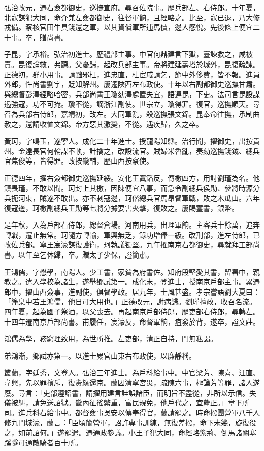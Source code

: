 \begin{pinyinscope}
弘治改元，遷右僉都御史，巡撫宣府。尋召佐院事。歷兵部左、右侍郎。十年夏，北寇謀犯大同，命介兼左僉都御史，往督軍餉，且經略之。比至，寇已退，乃大修戎備。察核官田牛具錢還之軍，以其資償軍所逋馬價，邊人感悅。先後條上便宜二十事。卒，贈尚書。

子昆，字承裕。弘治初進士。歷禮部主事。中官何鼎建言下獄，臺諫救之，咸被責。昆復論救，弗聽。父憂歸，起改兵部主事。帝將建延壽塔於城外，昆復疏諫。正德初，群小用事。請黜邪枉，進忠直，杜宦戚請乞，節中外侈費，皆不報。進員外郎，忤尚書劉宇，貶知解州。屢遷陜西左布政使。十年以右副都御史巡撫甘肅。與總督彭澤經略哈密，兵部尚書王瓊劾澤處置失宜，語連昆，下吏。法司言昆設謀遏強寇，功不可掩。瓊不從，謫浙江副使。世宗立，瓊得罪。復官，巡撫順天。尋召為兵部右侍郎，嘉靖初，改左。大同軍亂，殺巡撫張文錦。昆奉命往撫，承制曲赦之，還請收恤文錦。帝方惡其激變，不從。遇疾歸，久之卒。

黃珂，字鳴玉，遂寧人。成化二十年進士。授龍陽知縣。治行聞，擢御史，出按貴州。金達長官何輪謀不軌，計擒之，改設流官。賊婦米魯亂，奏劾巡撫錢鉞、總兵官焦俊等，皆得罪。改按畿輔，歷山西按察使。

正德四年，擢右僉都御史巡撫延綏。安化王寘鐇反，傳檄四方，用討劉瑾為名。他鎮畏瑾，不敢以聞。珂封上其檄，因陳便宜八事，而急令副總兵侯勛、參將時源分兵扼河東，賊遂不敢出。亦不剌寇邊，珂偕總兵官馬昂督軍戰，敗之木瓜山。六年復寇邊，珂檄副總兵王勛等七將分據要害夾擊，復敗之。屢賜璽書，銀幣。

是年秋，入為戶部右侍郎，總督倉場。河南用兵，出理軍餉。主客兵十餘萬，追奔轉戰，遷止無常。珂隨方轉輸，軍興無乏，錄功增俸一級。改刑部，進左侍郎，已改佐兵部。寧王宸濠謀復護衛，珂執議獨堅。九年擢南京右都御史，尋就拜工部尚書。以年至乞休歸，卒。贈太子少保，謚簡肅。

王鴻儒，字懋學，南陽人。少工書，家貧為府書佐。知府段堅愛其書，留署中，親教之。遣入學校為諸生，遂舉鄉試第一。成化末，登進士，授南京戶部主事。累遷郎中，擢山西僉事，進副使，俱督學政。居九年，士風甚盛。孝宗嘗語劉大夏曰：「籓臬中若王鴻儒，他日可大用也。」正德改元，謝病歸。劉瑾擅政，收召名流。四年夏，起為國子祭酒，以父喪去。再起南京戶部侍郎，歷吏部右侍郎，尋轉左。十四年遷南京戶部尚書。甫履任，宸濠反，命督軍餉，疽發於背，遂卒，謚文莊。

鴻儒為學，務窮理致用，為世所推。左吏部，清正自持，門無私謁。

弟鴻漸，鄉試亦第一。以進士累官山東右布政使，以廉靜稱。

叢蘭，字廷秀，文登人。弘治三年進士。為戶科給事中。中官梁芳、陳喜、汪直、韋興，先以罪擯斥，復夤緣還京。蘭因清寧宮災，疏陳六事，極論芳等罪，諸人遂廢。尋言：「吏部遵詔書，請擢用建言詿誤諸臣，而明旨不盡從，非所以示信。失儀被糾，請免送詔獄。畿內征徭繁重，富民規免，他戶代之，宜釐正。」章下所司。進兵科右給事中。都督僉事吳安以傳奉得官，蘭請罷之。時命撥團營軍八千人修九門城濠，蘭言：「臣頃簡營軍，詔許專事訓練，無復差撥，命下未幾，旋復役之，如前詔何。」遂罷遣。遷通政參議。小王子犯大同，命經略紫荊、倒馬諸關塞蹊隧可通敵騎者百十所。


\end{pinyinscope}

